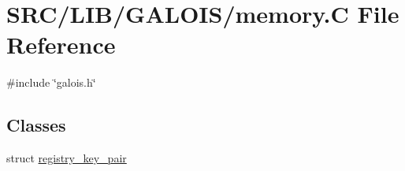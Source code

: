 \hypertarget{_g_a_l_o_i_s_2memory_8_c}{}\section{S\+R\+C/\+L\+I\+B/\+G\+A\+L\+O\+I\+S/memory.C File Reference}
\label{_g_a_l_o_i_s_2memory_8_c}
{\ttfamily \#include \char`\"{}galois.\+h\char`\"{}}\newline
\subsection*{Classes}
\begin{DoxyCompactItemize}
\item 
struct \mbox{\hyperlink{structregistry__key__pair}{registry\+\_\+key\+\_\+pair}}
\end{DoxyCompactItemize}
